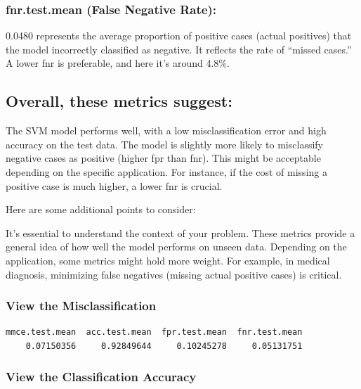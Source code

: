 \documentclass[
]{article}
\newenvironment{Shaded}{\begin{snugshade}}{\end{snugshade}}
\newcommand{\NormalTok}[1]{#1}
\newcommand{\SpecialCharTok}[1]{\textcolor[rgb]{0.81,0.36,0.00}{\textbf{#1}}}
\begin{document}
\subsubsection{fnr.test.mean (False Negative
Rate):}\label{fnr.test.mean-false-negative-rate-1}

0.0480 represents the average proportion of positive cases (actual
positives) that the model incorrectly classified as negative. It
reflects the rate of ``missed cases.'' A lower fnr is preferable, and
here it's around 4.8\%.

\subsection{Overall, these metrics
suggest:}\label{overall-these-metrics-suggest-1}

The SVM model performs well, with a low misclassification error and high
accuracy on the test data. The model is slightly more likely to
misclassify negative cases as positive (higher fpr than fnr). This might
be acceptable depending on the specific application. For instance, if
the cost of missing a positive case is much higher, a lower fnr is
crucial.

Here are some additional points to consider:

It's essential to understand the context of your problem. These metrics
provide a general idea of how well the model performs on unseen data.
Depending on the application, some metrics might hold more weight. For
example, in medical diagnosis, minimizing false negatives (missing
actual positive cases) is critical.

\subsubsection{View the
Misclassification}\label{view-the-misclassification}

\begin{Shaded}
\end{Shaded}

\begin{verbatim}
mmce.test.mean  acc.test.mean  fpr.test.mean  fnr.test.mean 
    0.07150356     0.92849644     0.10245278     0.05131751 
\end{verbatim}

\subsubsection{View the Classification
Accuracy}\label{view-the-classification-accuracy}
\end{document}
